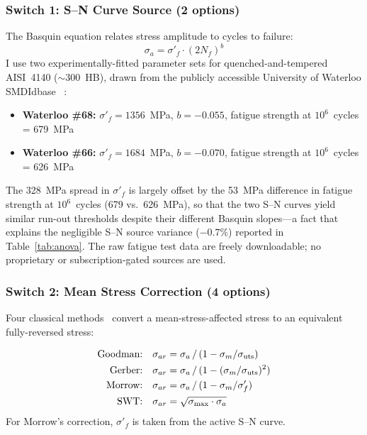 \documentclass[12pt,a4paper]{article}
\begin{document}
\subsubsection{Switch 1: S--N Curve Source (2 options)}

The Basquin equation relates stress amplitude to cycles to failure:
\begin{equation}
\sigma_a = \sigma'_f \cdot (2N_f)^b
\label{eq:basquin}
\end{equation}
I use two experimentally-fitted
parameter sets for quenched-and-tempered AISI~4140 ($\sim$300~HB),
drawn from the publicly accessible University of Waterloo SMDIdbase%
~\cite{waterloo_fde}:

\begin{itemize}
  \item \textbf{Waterloo \#68:} $\sigma'_f = 1356$~MPa, $b=-0.055$,
        fatigue strength at $10^6$~cycles = 679~MPa
  \item \textbf{Waterloo \#66:} $\sigma'_f = 1684$~MPa, $b=-0.070$,
        fatigue strength at $10^6$~cycles = 626~MPa
\end{itemize}

The 328~MPa spread in $\sigma'_f$ is largely offset by the 53~MPa
difference in fatigue strength at $10^6$~cycles (679 vs.\ 626~MPa),
so that the two S--N curves yield similar run-out thresholds despite
their different Basquin slopes---a fact that explains the negligible
S--N source variance ($-0.7$\%) reported in Table~\ref{tab:anova}.
The raw fatigue test data are freely downloadable; no proprietary or
subscription-gated sources are used.

\subsubsection{Switch 2: Mean Stress Correction (4 options)}

Four classical methods~\cite{stephens2001,dowling2013} convert a mean-stress-affected stress to an
equivalent fully-reversed stress:

\begin{subequations}\label{eq:mean_stress}
\begin{align}
\text{Goodman:}\quad
  \sigma_{ar} &= \sigma_a \,/\, (1 - \sigma_m/\sigma_{\rm uts})
  \label{eq:goodman} \\
\text{Gerber:}\quad
  \sigma_{ar} &= \sigma_a \,/\, (1 - (\sigma_m/\sigma_{\rm uts})^2)
  \label{eq:gerber} \\
\text{Morrow:}\quad
  \sigma_{ar} &= \sigma_a \,/\, (1 - \sigma_m/\sigma'_f)
  \label{eq:morrow} \\
\text{SWT:}\quad
  \sigma_{ar} &= \sqrt{\sigma_{\max} \cdot \sigma_a}
  \label{eq:swt}
\end{align}
\end{subequations}
For Morrow's correction, $\sigma'_f$ is taken from the active S--N
curve.
\end{document}
